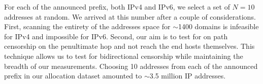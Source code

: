 For each of the announced prefix, both IPv4 and IPv6, we select a set of $N=10$
addresses at random. We arrived at this number after a couple of considerations. First, scanning the entirety of the addresses space for $\sim$1400 domains is infeasible for IPv4 and impossible for IPv6. Second, our aim is to test for on path censorship on the penultimate hop and not reach the end hosts themselves. This technique allows us to test for bidirectional censorship while maintaining the breadth of our measurements. Choosing 10 addresses from each of the announced prefix in our allocation dataset amounted to $\sim$3.5 million IP addresses.


